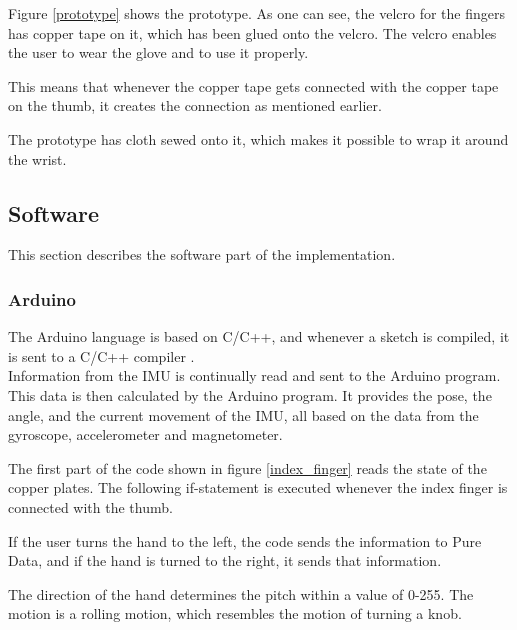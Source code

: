 Figure \ref{prototype} shows the prototype. As one can see, the velcro for the fingers has copper tape on it, which has been glued onto the velcro. The velcro enables the user to wear the glove and to use it properly. 
 
This means that whenever the copper tape gets connected with the copper tape on the thumb, it creates the connection as mentioned earlier. 

The prototype has cloth sewed onto it, which makes it possible to wrap it around the wrist. \\

\begin{minipage}{\linewidth}%
\label{prototype}
\end{minipage}

\subsection{Software}

This section describes the software part of the implementation. 

\subsubsection{Arduino}
The Arduino language is based on C/C++, and whenever a sketch is compiled, it is sent to a C/C++ compiler \citep{Arduino_FAQ}.\\

Information from the IMU is continually read and sent to the Arduino program. This data is then calculated by the Arduino program. It provides the pose, the angle, and the current movement of the IMU, all based on the data from the gyroscope, accelerometer and magnetometer.

The first part of the code shown in figure \ref{index_finger} reads the state of the copper plates. The following if-statement is executed whenever the index finger is connected with the thumb. 

If the user turns the hand to the left, the code sends the information to Pure Data, and if the hand is turned to the right, it sends that information. 

The direction of the hand determines the pitch within a value of 0-255. The motion is a rolling motion, which resembles the motion of turning a knob. \\



